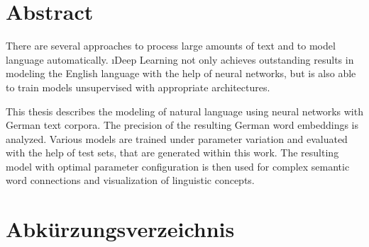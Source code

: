 \BlankPage

\chapter*{Abstract}
There are several approaches to process large amounts of text and to model language automatically. \i{Deep Learning} not only achieves outstanding results in modeling the English language with the help of neural networks, but is also able to train models unsupervised with appropriate architectures.

This thesis describes the modeling of natural language using neural networks with German text corpora. The precision of the resulting German word embeddings is analyzed. Various models are trained under parameter variation and evaluated with the help of test sets, that are generated within this work. The resulting model with optimal parameter configuration is then used for complex semantic word connections and visualization of linguistic concepts.


\tableofcontents
\listoffigures
\listoftables

\chapter*{Abkürzungsverzeichnis}\label{s.abbr}
\begin{acronym}[----------------]
\end{acronym}


